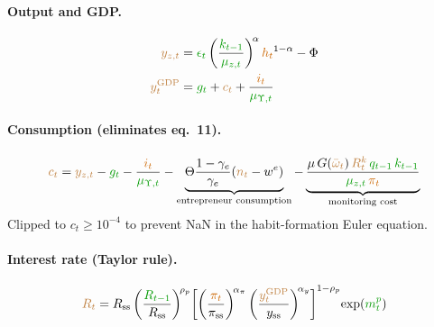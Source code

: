 \documentclass[11pt]{article}
\begin{document}
\paragraph{Output and GDP.}
\begin{align*}
  \textcolor{brown}{y_{z,t}}
    &= \textcolor{green!60!black}{\epsilon_t}
       \left(\frac{\textcolor{green!60!black}{k_{t-1}}}{\textcolor{green!60!black}{\mu_{z,t}}}\right)^{\!\alpha}
       \textcolor{orange!80!black}{h_t}^{1-\alpha} - \Phi
  \\
  \textcolor{brown}{y_t^{\text{GDP}}}
    &= \textcolor{green!60!black}{g_t} + \textcolor{brown}{c_t}
       + \frac{\textcolor{orange!80!black}{i_t}}{\textcolor{green!60!black}{\mu_{\Upsilon,t}}}
\end{align*}

\paragraph{Consumption (eliminates eq.~11).}
\begin{equation*}
  \textcolor{brown}{c_t} = \textcolor{brown}{y_{z,t}} - \textcolor{green!60!black}{g_t}
    - \frac{\textcolor{orange!80!black}{i_t}}{\textcolor{green!60!black}{\mu_{\Upsilon,t}}}
    - \underbrace{\Theta\frac{1-\gamma_e}{\gamma_e}(\textcolor{brown}{n_t} - w^e)}_{\text{entrepreneur consumption}}
    - \underbrace{\frac{\mu\,G(\textcolor{brown}{\bar\omega_t})\,\textcolor{brown}{R_t^k}\,
      \textcolor{green!60!black}{q_{t-1}}\,\textcolor{green!60!black}{k_{t-1}}}
      {\textcolor{green!60!black}{\mu_{z,t}}\,\textcolor{orange!80!black}{\pi_t}}}_{\text{monitoring cost}}
\end{equation*}
Clipped to $c_t \geq 10^{-4}$ to prevent NaN in the habit-formation Euler equation.

\paragraph{Interest rate (Taylor rule).}
\begin{equation*}
  \textcolor{brown}{R_t}
    = R_{\text{ss}} \left(\frac{\textcolor{green!60!black}{R_{t-1}}}{R_{\text{ss}}}\right)^{\!\rho_p}
      \!\left[
        \left(\frac{\textcolor{orange!80!black}{\pi_t}}{\pi_{\text{ss}}}\right)^{\!\alpha_\pi}
        \left(\frac{\textcolor{brown}{y_t^{\text{GDP}}}}{y_{\text{ss}}}\right)^{\!\alpha_y}
      \right]^{1-\rho_p}
      \!\exp(\textcolor{green!60!black}{m_t^p})
\end{equation*}
\end{document}
